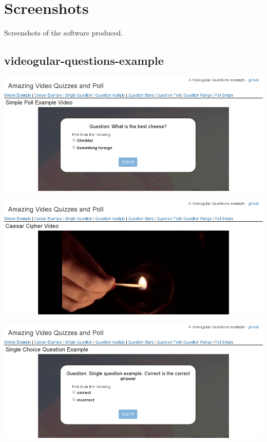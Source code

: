 \chapter{Screenshots} \label{App:Screenshots}

\begin{preamble}
	Screenshots of the software produced.
\end{preamble}

\section{videogular-questions-example}

\includegraphics[width=\textwidth]{screenshots/videogular-questions-example-poll-simple.png}

\includegraphics[width=\textwidth]{screenshots/videogular-questions-example-caesar-example.png}

\includegraphics[width=\textwidth]{screenshots/videogular-questions-example-question-single.png}

